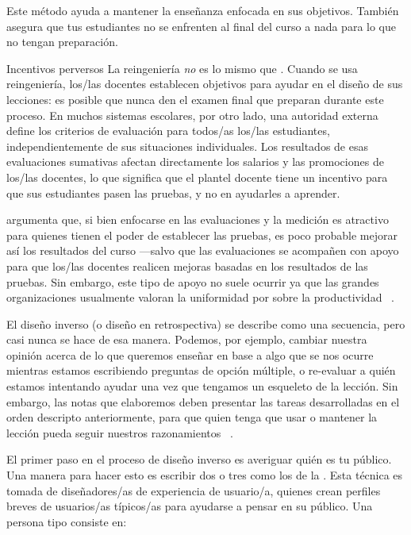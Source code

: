 Este método ayuda a mantener la enseñanza enfocada en sus objetivos.
También asegura que tus estudiantes no se enfrenten al final del curso
a nada para lo que no tengan preparación.
 
\begin{aside}{Incentivos perversos}
La reingeniería \emph{no} es lo mismo que .
Cuando se usa reingeniería,
los/las docentes establecen objetivos para ayudar en el diseño de sus lecciones:
es posible que nunca den el examen final que preparan durante este proceso.
En muchos sistemas escolares,
por otro lado,
una autoridad externa define los criterios de evaluación para todos/as los/las estudiantes,
independientemente de sus situaciones individuales.
Los resultados de esas evaluaciones sumativas afectan directamente los salarios y las promociones de los/las docentes,
lo que significa que el plantel docente tiene un incentivo para que sus estudiantes pasen las pruebas, y no en ayudarles a aprender.
 
\cite{Gree2014} argumenta que, si bien enfocarse en las evaluaciones y la medición es atractivo para quienes tienen el poder de establecer las pruebas, es poco probable mejorar así los resultados del curso ---salvo que las evaluaciones se acompañen con apoyo para que los/las docentes realicen mejoras basadas en los resultados de las pruebas.
Sin embargo, este tipo de apoyo no suele ocurrir ya que
las grandes organizaciones usualmente valoran la uniformidad por sobre la productividad ~\cite{Scot1998}.
\end{aside}
 
El diseño inverso (o diseño en retrospectiva) se describe como una secuencia,
pero casi nunca se hace de esa manera.
Podemos,
por ejemplo, cambiar nuestra opinión acerca de lo que queremos enseñar
en base a algo que se nos ocurre mientras estamos escribiendo preguntas de opción múltiple,
o re-evaluar a quién estamos intentando ayudar una vez que tengamos un esqueleto de la lección.
Sin embargo,
las notas que elaboremos deben presentar las tareas desarrolladas en el orden descripto anteriormente, para que quien tenga que usar o mantener la lección pueda seguir nuestros razonamientos
~\cite{Parn1986}.
 
 
El primer paso en el proceso de diseño inverso es averiguar quién es tu público.
Una manera para hacer esto es escribir dos o tres
como los de la .
Esta técnica es tomada de diseñadores/as de experiencia de usuario/a,
quienes crean perfiles breves de usuarios/as típicos/as
para ayudarse a pensar en su público.
Una persona tipo consiste en:
 
